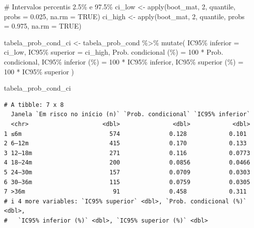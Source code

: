 \documentclass[
]{article}
\newenvironment{Shaded}{\begin{snugshade}}{\end{snugshade}}
\newcommand{\AttributeTok}[1]{\textcolor[rgb]{0.40,0.45,0.13}{#1}}
\newcommand{\CommentTok}[1]{\textcolor[rgb]{0.37,0.37,0.37}{#1}}
\newcommand{\ConstantTok}[1]{\textcolor[rgb]{0.56,0.35,0.01}{#1}}
\newcommand{\DecValTok}[1]{\textcolor[rgb]{0.68,0.00,0.00}{#1}}
\newcommand{\FloatTok}[1]{\textcolor[rgb]{0.68,0.00,0.00}{#1}}
\newcommand{\FunctionTok}[1]{\textcolor[rgb]{0.28,0.35,0.67}{#1}}
\newcommand{\NormalTok}[1]{\textcolor[rgb]{0.00,0.23,0.31}{#1}}
\newcommand{\OtherTok}[1]{\textcolor[rgb]{0.00,0.23,0.31}{#1}}
\newcommand{\SpecialCharTok}[1]{\textcolor[rgb]{0.37,0.37,0.37}{#1}}
\newcommand{\StringTok}[1]{\textcolor[rgb]{0.13,0.47,0.30}{#1}}
\begin{document}
\begin{Shaded}
\begin{Highlighting}[]
\CommentTok{\# Intervalos percentis 2.5\% e 97.5\%}
\NormalTok{ci\_low  }\OtherTok{\textless{}{-}} \FunctionTok{apply}\NormalTok{(boot\_mat, }\DecValTok{2}\NormalTok{, quantile, }\AttributeTok{probs =} \FloatTok{0.025}\NormalTok{, }\AttributeTok{na.rm =} \ConstantTok{TRUE}\NormalTok{)}
\NormalTok{ci\_high }\OtherTok{\textless{}{-}} \FunctionTok{apply}\NormalTok{(boot\_mat, }\DecValTok{2}\NormalTok{, quantile, }\AttributeTok{probs =} \FloatTok{0.975}\NormalTok{, }\AttributeTok{na.rm =} \ConstantTok{TRUE}\NormalTok{)}

\NormalTok{tabela\_prob\_cond\_ci }\OtherTok{\textless{}{-}}\NormalTok{ tabela\_prob\_cond }\SpecialCharTok{\%\textgreater{}\%}
  \FunctionTok{mutate}\NormalTok{(}
    \StringTok{\textasciigrave{}}\AttributeTok{IC95\% inferior}\StringTok{\textasciigrave{}} \OtherTok{=}\NormalTok{ ci\_low,}
    \StringTok{\textasciigrave{}}\AttributeTok{IC95\% superior}\StringTok{\textasciigrave{}} \OtherTok{=}\NormalTok{ ci\_high,}
    \StringTok{\textasciigrave{}}\AttributeTok{Prob. condicional (\%)}\StringTok{\textasciigrave{}} \OtherTok{=} \DecValTok{100} \SpecialCharTok{*} \StringTok{\textasciigrave{}}\AttributeTok{Prob. condicional}\StringTok{\textasciigrave{}}\NormalTok{,}
    \StringTok{\textasciigrave{}}\AttributeTok{IC95\% inferior (\%)}\StringTok{\textasciigrave{}} \OtherTok{=} \DecValTok{100} \SpecialCharTok{*} \StringTok{\textasciigrave{}}\AttributeTok{IC95\% inferior}\StringTok{\textasciigrave{}}\NormalTok{,}
    \StringTok{\textasciigrave{}}\AttributeTok{IC95\% superior (\%)}\StringTok{\textasciigrave{}} \OtherTok{=} \DecValTok{100} \SpecialCharTok{*} \StringTok{\textasciigrave{}}\AttributeTok{IC95\% superior}\StringTok{\textasciigrave{}}
\NormalTok{  )}

\NormalTok{tabela\_prob\_cond\_ci}
\end{Highlighting}
\end{Shaded}

\begin{verbatim}
# A tibble: 7 x 8
  Janela `Em risco no início (n)` `Prob. condicional` `IC95% inferior`
  <chr>                     <dbl>               <dbl>            <dbl>
1 ≤6m                         574              0.128            0.101 
2 6–12m                       415              0.170            0.133 
3 12–18m                      271              0.116            0.0773
4 18–24m                      200              0.0856           0.0466
5 24–30m                      157              0.0709           0.0303
6 30–36m                      115              0.0759           0.0305
7 >36m                         91              0.458            0.311 
# i 4 more variables: `IC95% superior` <dbl>, `Prob. condicional (%)` <dbl>,
#   `IC95% inferior (%)` <dbl>, `IC95% superior (%)` <dbl>
\end{verbatim}
\end{document}
